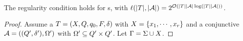 \begin{lemma}\label{lem-2pt}
The  regularity condition  \prerec{} holds for \PPT{}s, with $\ell(|T|, |\mathcal{A}|) = 2^{\mathcal{O}(|T||\mathcal{A}|\log (|T||\mathcal{A}|))}$.
\end{lemma}

\begin{proof}
Assume a \PPT{} $T=(X, Q, q_0, F, \delta)$ with $X = \{x_1,\cdots, x_r\}$ and a conjunctive \FA{} $\mathcal{A} = ((Q', \delta'), \Omega')$ with $\Omega' \subseteq Q' \times Q'$. %
Let $\Gamma = \Sigma \cup X$.


\end{proof}
